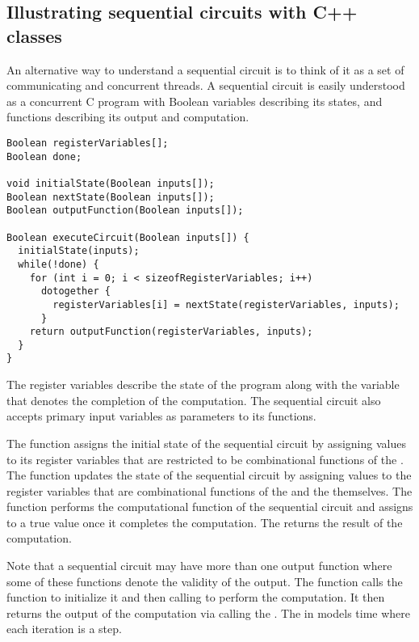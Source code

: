 \subsection{Illustrating sequential circuits with C++ 
    classes}
\label{sec:back:crct_cpp}

An alternative way to understand a sequential circuit is
to think of it as a set of communicating and concurrent
threads.  A sequential circuit is easily understood as a
concurrent C program with Boolean variables describing 
its states, and functions describing its output and
computation.

\begin{lstlisting}
Boolean registerVariables[];
Boolean done;
  
void initialState(Boolean inputs[]);
Boolean nextState(Boolean inputs[]);
Boolean outputFunction(Boolean inputs[]);

Boolean executeCircuit(Boolean inputs[]) {
  initialState(inputs);
  while(!done) {
    for (int i = 0; i < sizeofRegisterVariables; i++) 
      dotogether {
        registerVariables[i] = nextState(registerVariables, inputs); 
      }
    return outputFunction(registerVariables, inputs); 
  } 
} 
\end{lstlisting}

The register variables describe the state of the program along with the  
variable that denotes the completion of the computation.  
The sequential circuit also accepts primary input variables as parameters to its functions. 

The  function assigns the initial
state of the sequential circuit by assigning values to its
register variables that are restricted to be combinational
functions of the .  The 
function updates the state of the sequential circuit by
assigning values to the register variables that are
combinational functions of the  and the
 themselves.  The  
function performs the computational function of
the sequential circuit and assigns  to a
$\mbox{true}$ value once it completes the computation.
The  returns the result of the
computation. 

Note that a sequential circuit may have more than one
output function where some of these functions denote the
validity of the output.  The function
 calls the 
function to initialize it and then calling
 to perform the computation.  It then
returns the output of the computation via calling the
.  The  in
 models time where each iteration
is a step. 

